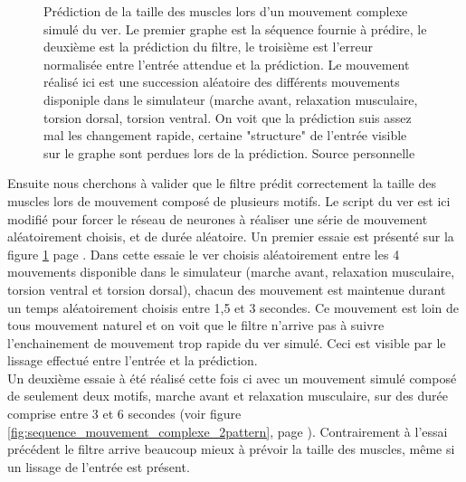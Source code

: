 \begin{figure}[ht]
   \begin{center}
   \end{center}
   \caption[Prédiction de la taille des muscles lors d'un mouvement complexe
   simulé]{Prédiction de la taille des muscles lors d'un mouvement complexe
   simulé du ver. Le premier graphe est la séquence fournie à prédire, le
   deuxième est la prédiction du filtre, le troisième est l'erreur normalisée
   entre l'entrée attendue et la prédiction. Le mouvement réalisé ici est une
   succession aléatoire des différents mouvements disponiple dans le simulateur
   (marche avant, relaxation musculaire, torsion dorsal, torsion ventral. On
   voit que la prédiction suis assez mal les changement rapide, certaine
   "structure" de l'entrée visible sur le graphe sont perdues lors de la
   prédiction. Source personnelle}
   \label{fig:sequence_mouvement_complexe}
\end{figure}

Ensuite nous cherchons à valider que le filtre prédit correctement la taille
des muscles lors de mouvement composé de plusieurs motifs. Le script du ver est
ici modifié pour forcer le réseau de neurones à réaliser une série de mouvement
aléatoirement choisis, et de durée aléatoire. Un premier essaie est présenté
sur la figure \ref{fig:sequence_mouvement_complexe} page
\pageref{fig:sequence_mouvement_complexe}.  Dans cette essaie le ver choisis
aléatoirement entre les 4 mouvements disponible dans le simulateur (marche
avant, relaxation musculaire, torsion ventral et torsion dorsal), chacun des
mouvement est maintenue durant un temps aléatoirement choisis entre 1,5 et 3
secondes. Ce mouvement est loin de tous mouvement naturel et on voit que le
filtre n'arrive pas à suivre l'enchainement de mouvement trop rapide du ver
simulé. Ceci est visible par le lissage effectué entre l'entrée et la
prédiction.\\


Un deuxième essaie à été réalisé cette fois ci avec un mouvement simulé
composé de seulement deux motifs, marche avant et relaxation musculaire,
sur des durée comprise entre 3 et 6 secondes (voir figure \ref{fig:sequence_mouvement_complexe_2pattern},
page \pageref{fig:sequence_mouvement_complexe_2pattern}). Contrairement à l'essai
précédent le filtre arrive beaucoup mieux à prévoir la taille des muscles, même
si un lissage de l'entrée est présent.

